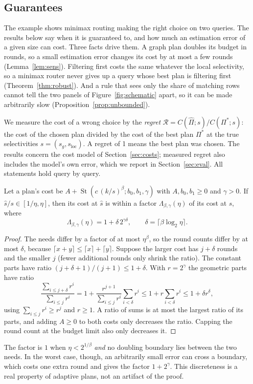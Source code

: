 \documentclass[sigconf,nonacm]{acmart}
\newcommand{\sg}{s_g}
\newcommand{\sloc}{s_{\text{loc}}}
\begin{document}
\subsection{Guarantees}\label{sec:theory}
The example shows minimax routing making the right choice on two queries. The results below say when it is guaranteed to, and how much an estimation error of a given size can cost. Three facts drive them. A graph plan doubles its budget in rounds, so a small estimation error changes its cost by at most a few rounds (Lemma~\ref{lem:sens}). Filtering first costs the same whatever the local selectivity, so a minimax router never gives up a query whose best plan is filtering first (Theorem~\ref{thm:robust}). And a rule that sees only the share of matching rows cannot tell the two panels of Figure~\ref{fig:schematic} apart, so it can be made arbitrarily slow (Proposition~\ref{prop:unbounded}).

We measure the cost of a wrong choice by the \emph{regret} $\mathcal{R}=C(\hat\Pi;s)/C(\Pi^*;s)$: the cost of the chosen plan divided by the cost of the best plan $\Pi^*$ at the true selectivities $s=(\sg,\sloc)$. A regret of 1 means the best plan was chosen. The results concern the cost model of Section~\ref{sec:costs}; measured regret also includes the model's own error, which we report in Section~\ref{sec:eval}. All statements hold query by query.
\begin{lemma}\label{lem:sens}
Let a plan's cost be $A+\operatorname{St}(c\,(k/s)^\beta;b_0,b_1,\gamma)$ with $A,b_0,b_1\ge0$ and $\gamma>0$. If $\hat s/s\in[1/\eta,\eta]$, then its cost at $\hat s$ is within a factor $\Lambda_{\beta,\gamma}(\eta)$ of its cost at $s$, where
\[
\Lambda_{\beta,\gamma}(\eta)=1+\delta\,2^{\gamma\delta},\qquad \delta=\lceil\beta\log_2\eta\rceil .
\]
\end{lemma}
\begin{proof}
The needs differ by a factor of at most $\eta^\beta$, so the round counts differ by at most $\delta$, because $\lceil x+y\rceil\le\lceil x\rceil+\lceil y\rceil$. Suppose the larger cost has $j+\delta$ rounds and the smaller $j$ (fewer additional rounds only shrink the ratio). The constant parts have ratio $(j+\delta+1)/(j+1)\le1+\delta$. With $r=2^\gamma$ the geometric parts have ratio
\[
\frac{\sum_{i\le j+\delta}r^i}{\sum_{i\le j}r^i}=1+\frac{r^{j+1}}{\sum_{i\le j}r^i}\sum_{i<\delta}r^i\le1+r\sum_{i<\delta}r^{i}\le1+\delta r^{\delta},
\]
using $\sum_{i\le j}r^i\ge r^j$ and $r\ge1$. A ratio of sums is at most the largest ratio of its parts, and adding $A\ge0$ to both costs only decreases the ratio. Capping the round count at the budget limit also only decreases it.
\end{proof}
The factor is $1$ when $\eta<2^{1/\beta}$ \emph{and} no doubling boundary lies between the two needs. In the worst case, though, an arbitrarily small error can cross a boundary, which costs one extra round and gives the factor $1+2^\gamma$. This discreteness is a real property of adaptive plans, not an artifact of the proof.
\end{document}
